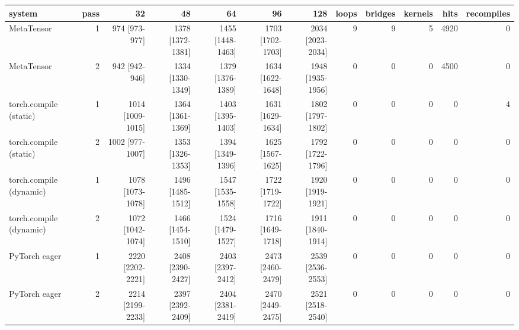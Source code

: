 \begin{tabular}{lrrrrrrrrrrr}
\toprule
system & pass & 32 & 48 & 64 & 96 & 128 & loops & bridges & kernels & hits & recompiles \\
\midrule
MetaTensor & 1 & 974 [973-977] & 1378 [1372-1381] & 1455 [1448-1463] & 1703 [1702-1703] & 2034 [2023-2034] & 9 & 9 & 5 & 4920 & 0 \\
MetaTensor & 2 & 942 [942-946] & 1334 [1330-1349] & 1379 [1376-1389] & 1634 [1622-1648] & 1948 [1935-1956] & 0 & 0 & 0 & 4500 & 0 \\
torch.compile (static) & 1 & 1014 [1009-1015] & 1364 [1361-1369] & 1403 [1395-1403] & 1631 [1629-1634] & 1802 [1797-1802] & 0 & 0 & 0 & 0 & 4 \\
torch.compile (static) & 2 & 1002 [977-1007] & 1353 [1326-1353] & 1394 [1349-1396] & 1625 [1567-1625] & 1792 [1722-1796] & 0 & 0 & 0 & 0 & 0 \\
torch.compile (dynamic) & 1 & 1078 [1073-1078] & 1496 [1485-1512] & 1547 [1535-1558] & 1722 [1719-1722] & 1920 [1919-1921] & 0 & 0 & 0 & 0 & 0 \\
torch.compile (dynamic) & 2 & 1072 [1042-1074] & 1466 [1454-1510] & 1524 [1479-1527] & 1716 [1649-1718] & 1911 [1840-1914] & 0 & 0 & 0 & 0 & 0 \\
PyTorch eager & 1 & 2220 [2202-2221] & 2408 [2390-2427] & 2403 [2397-2412] & 2473 [2460-2479] & 2539 [2536-2553] & 0 & 0 & 0 & 0 & 0 \\
PyTorch eager & 2 & 2214 [2199-2233] & 2397 [2392-2409] & 2404 [2381-2419] & 2470 [2449-2475] & 2521 [2518-2540] & 0 & 0 & 0 & 0 & 0 \\
\bottomrule
\end{tabular}
